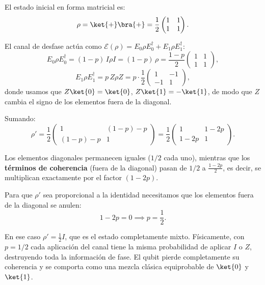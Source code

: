 El estado inicial en forma matricial es:
$$
    \rho = \ket{+}\bra{+} = \frac{1}{2}\begin{pmatrix} 1 & 1 \\ 1 & 1 \end{pmatrix}.
$$

El canal de desfase actúa como $\mathcal{E}(\rho) = E_0 \rho E_0^\dagger + E_1 \rho E_1^\dagger$:
$$
    E_0 \rho E_0^\dagger = (1-p)\, I \rho I = (1-p)\, \rho = \frac{1-p}{2}\begin{pmatrix} 1 & 1 \\ 1 & 1 \end{pmatrix},
$$
$$
    E_1 \rho E_1^\dagger = p\, Z \rho Z = p \cdot \frac{1}{2}\begin{pmatrix} 1 & -1 \\ -1 & 1 \end{pmatrix},
$$
donde usamos que $Z\ket{0}=\ket{0}$, $Z\ket{1}=-\ket{1}$, de modo que $Z$ cambia el signo de los elementos fuera de la diagonal.

Sumando:
$$
    \rho' = \frac{1}{2}\begin{pmatrix} 1 & (1-p) - p \\ (1-p) - p & 1 \end{pmatrix} = \frac{1}{2}\begin{pmatrix} 1 & 1-2p \\ 1-2p & 1 \end{pmatrix}.
$$

Los elementos diagonales permanecen iguales ($1/2$ cada uno), mientras que los \textbf{términos de coherencia} (fuera de la diagonal) pasan de $1/2$ a $\frac{1-2p}{2}$, es decir, se multiplican exactamente por el factor $(1-2p)$.

Para que $\rho'$ sea proporcional a la identidad necesitamos que los elementos fuera de la diagonal se anulen:
$$
    1 - 2p = 0 \implies \boxed{p = \frac{1}{2}.}
$$

En ese caso $\rho' = \frac{1}{2}I$, que es el estado completamente mixto. Físicamente, con $p = 1/2$ cada aplicación del canal tiene la misma probabilidad de aplicar $I$ o $Z$, destruyendo toda la información de fase. El qubit pierde completamente su coherencia y se comporta como una mezcla clásica equiprobable de $\ket{0}$ y $\ket{1}$.

\vspace{0.5cm}

